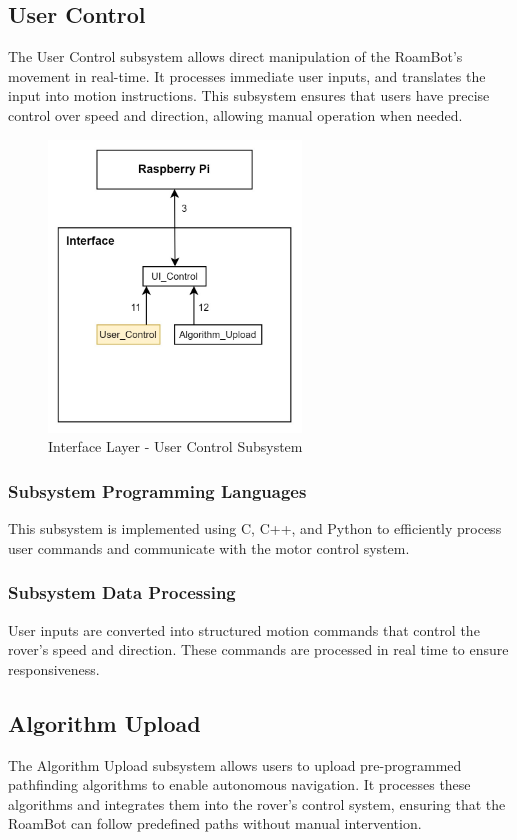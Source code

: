 \newpage

\subsection{User Control}
The User Control subsystem allows direct manipulation of the RoamBot's movement in real-time. It processes immediate user inputs, and translates the input into motion instructions. This subsystem ensures that users have precise control over speed and direction, allowing manual operation when needed.

\begin{figure}[h!]
	\centering
 	\includegraphics[width=0.60\textwidth]{images/interface/2_user.jpg}
 \caption{Interface Layer - User Control Subsystem}
\end{figure}

\subsubsection{Subsystem Programming Languages}
This subsystem is implemented using C, C++, and Python to efficiently process user commands and communicate with the motor control system.

\subsubsection{Subsystem Data Processing}
User inputs are converted into structured motion commands that control the rover's speed and direction. These commands are processed in real time to ensure responsiveness.

\newpage

\subsection{Algorithm Upload}
The Algorithm Upload subsystem allows users to upload pre-programmed pathfinding algorithms to enable autonomous navigation. It processes these algorithms and integrates them into the rover's control system, ensuring that the RoamBot can follow predefined paths without manual intervention.

